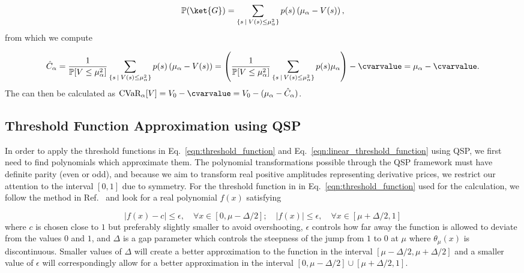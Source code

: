 \begin{enumerate}
\begin{equation}
	\label{eqn:cvar_threshold_prob}
	\mathbb{P}(\ket{G}) = \sum_{ \{s  \: | \: V(s) \le \mu_{\alpha}^2\} } p(s)\left(\mu_{\alpha}-V(s)\right),
\end{equation}
from which we compute

\begin{equation}
	\hat{C}_{\alpha} = \frac{1}{\mathbb{P}[V \le \mu_{\alpha}^2]} \sum_{ \{s  \: | \: V(s) \le \mu_{\alpha}^2\} } p(s)\left(\mu_{\alpha}-V(s)\right) = \left(\frac{1}{\mathbb{P}[V \le \mu_{\alpha}^2]}\sum_{ \{s  \: | \: V(s) \le \mu_{\alpha}^2\} } p(s)\mu_{\alpha}\right) - \cvarvalue= \mu_{\alpha} -\cvarvalue.
\end{equation}
The \cvar{} can then be calculated as $\textrm{CVaR}_{\alpha}[V] = V_0 - \cvarvalue = V_0 - (\mu_{\alpha} - \hat{C}_{\alpha})$.


\subsection{Threshold Function Approximation using QSP}
\label{sec:thres_approximation}
In order to apply the threshold functions in Eq.~\eqref{eqn:threshold_function} and Eq.~\eqref{eqn:linear_threshold_function} using QSP, we first need to find polynomials which approximate them.
The polynomial transformations possible through the QSP framework must have definite parity (even or odd), and because we aim to transform real positive amplitudes representing derivative prices, we restrict our attention to the interval $[0,1]$ due to symmetry.
For the threshold function in in Eq.~\eqref{eqn:threshold_function} used for the \var{} calculation, we follow the method in Ref.~\cite{dong2022ground} and look for a real polynomial $f(x)$ satisfying

\begin{equation}
	|f(x) - c| \le \epsilon, \quad \forall x \in [0, \mu-\Delta/2]; \quad |f(x)| \le \epsilon, \quad \forall x \in [\mu+\Delta/2, 1]
\end{equation}
where $c$ is chosen close to $1$ but preferably slightly smaller to avoid overshooting, $\epsilon$ controls how far away the function is allowed to deviate from the values $0$ and $1$, and $\Delta$ is a gap parameter which controls the steepness of the jump from $1$ to $0$ at $\mu$ where $\theta_{\mu}(x)$ is discontinuous.
Smaller values of $\Delta$ will create a better approximation to the function in the interval $[\mu-\Delta/2, \mu+\Delta/2]$ and a smaller value of $\epsilon$ will correspondingly allow for a better approximation in the interval $[0, \mu-\Delta/2] \cup [\mu+\Delta/2, 1]$.


\end{enumerate}
